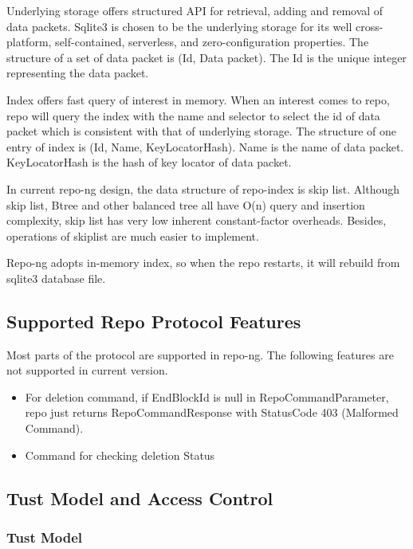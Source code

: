 \documentclass{acm_proc_article-sp}
\begin{document}
Underlying storage offers structured API for retrieval, adding and removal of data packets. Sqlite3 is chosen to be the underlying storage for its well cross-platform, self-contained, serverless, and zero-configuration properties. The structure of a set of data packet is (Id, Data packet). The Id is the unique integer representing the data packet.

Index offers fast query of interest in memory. When an interest comes to repo, repo will query the index with the name and selector to select the id of data packet which is consistent with that of underlying storage. The structure of one entry of index is (Id, Name, KeyLocatorHash). Name is the name of data packet. KeyLocatorHash is the hash of key locator of data packet.

In current repo-ng design, the data structure of repo-index is skip list. \cite{pugh1990skip} Although skip list, Btree and other balanced tree all have O(n) query and insertion complexity, skip list has very low inherent constant-factor overheads. Besides, operations of skiplist are much easier to implement.


Repo-ng adopts in-memory index, so when the repo restarts, it will rebuild from sqlite3 database file.

\subsection{Supported Repo Protocol Features}
Most parts of the protocol are supported in repo-ng. The following features are not supported in current version.

\begin{itemize}

\item For deletion command, if EndBlockId is null in RepoCommandParameter, repo just returns RepoCommandResponse with StatusCode 403 (Malformed Command).

\item Command for checking deletion Status

\end{itemize}

\subsection{Tust Model and Access Control}

\subsubsection{Tust Model}
\end{document}
